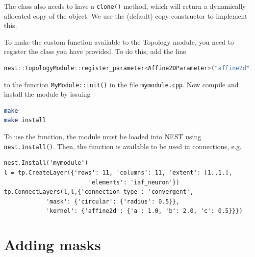 \documentclass[a4paper,12pt]{report}
\begin{document}
The class also needs to have a \lstinline!clone()! method, which will return
a dynamically allocated copy of the object. We use the (default) copy
constructor to implement this.

To make the custom function available to the Topology module, you need to
register the class you have provided. To do this, add the line
\begin{lstlisting}[language=C++]
nest::TopologyModule::register_parameter<Affine2DParameter>("affine2d");
\end{lstlisting}
to the function \lstinline!MyModule::init()! in the file
\lstinline!mymodule.cpp!. Now compile and install the module by issuing
\begin{lstlisting}[language=bash]
make
make install
\end{lstlisting}
To use the function, the module must be loaded into NEST using
\lstinline!nest.Install()!. Then, the function is
available to be used in connections, e.g.
\begin{lstlisting}
nest.Install('mymodule')
l = tp.CreateLayer({'rows': 11, 'columns': 11, 'extent': [1.,1.],
                        'elements': 'iaf_neuron'})
tp.ConnectLayers(l,l,{'connection_type': 'convergent',
            'mask': {'circular': {'radius': 0.5}},
            'kernel': {'affine2d': {'a': 1.0, 'b': 2.0, 'c': 0.5}}})
\end{lstlisting}

\section{Adding masks}
\end{document}
